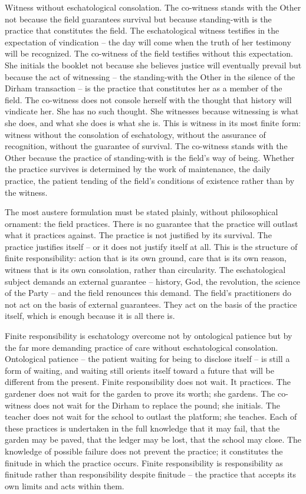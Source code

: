 Witness without eschatological consolation. The co-witness stands with the Other not because the field guarantees survival but because standing-with is the practice that constitutes the field. The eschatological witness testifies in the expectation of vindication -- the day will come when the truth of her testimony will be recognized. The co-witness of the field testifies without this expectation. She initials the booklet not because she believes justice will eventually prevail but because the act of witnessing -- the standing-with the Other in the silence of the Dirham transaction -- is the practice that constitutes her as a member of the field. The co-witness does not console herself with the thought that history will vindicate her. She has no such thought. She witnesses because witnessing is what she does, and what she does is what she is. This is witness in its most finite form: witness without the consolation of eschatology, without the assurance of recognition, without the guarantee of survival. The co-witness stands with the Other because the practice of standing-with is the field's way of being. Whether the practice survives is determined by the work of maintenance, the daily practice, the patient tending of the field's conditions of existence rather than by the witness.

The most austere formulation must be stated plainly, without philosophical ornament: the field practices. There is no guarantee that the practice will outlast what it practices against. The practice is not justified by its survival. The practice justifies itself -- or it does not justify itself at all. This is the structure of finite responsibility: action that is its own ground, care that is its own reason, witness that is its own consolation, rather than circularity. The eschatological subject demands an external guarantee -- history, God, the revolution, the science of the Party -- and the field renounces this demand. The field's practitioners do not act on the basis of external guarantees. They act on the basis of the practice itself, which is enough because it is all there is.

Finite responsibility is eschatology overcome not by ontological patience but by the far more demanding practice of care without eschatological consolation. Ontological patience -- the patient waiting for being to disclose itself -- is still a form of waiting, and waiting still orients itself toward a future that will be different from the present. Finite responsibility does not wait. It practices. The gardener does not wait for the garden to prove its worth; she gardens. The co-witness does not wait for the Dirham to replace the pound; she initials. The teacher does not wait for the school to outlast the platform; she teaches. Each of these practices is undertaken in the full knowledge that it may fail, that the garden may be paved, that the ledger may be lost, that the school may close. The knowledge of possible failure does not prevent the practice; it constitutes the finitude in which the practice occurs. Finite responsibility is responsibility as finitude rather than responsibility despite finitude -- the practice that accepts its own limits and acts within them.

